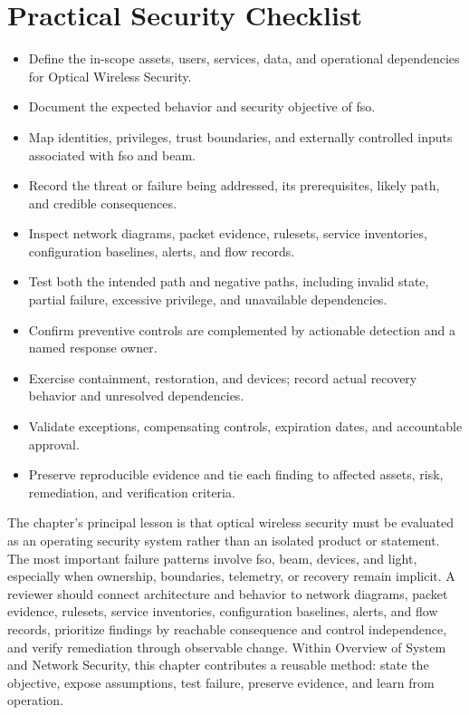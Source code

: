 \documentclass[11pt]{article}
\begin{document}
\section*{Practical Security Checklist}
\begin{itemize}[label=$\square$]
\item Define the in-scope assets, users, services, data, and operational dependencies for Optical Wireless Security.
\item Document the expected behavior and security objective of fso.
\item Map identities, privileges, trust boundaries, and externally controlled inputs associated with fso and beam.
\item Record the threat or failure being addressed, its prerequisites, likely path, and credible consequences.
\item Inspect network diagrams, packet evidence, rulesets, service inventories, configuration baselines, alerts, and flow records.
\item Test both the intended path and negative paths, including invalid state, partial failure, excessive privilege, and unavailable dependencies.
\item Confirm preventive controls are complemented by actionable detection and a named response owner.
\item Exercise containment, restoration, and devices; record actual recovery behavior and unresolved dependencies.
\item Validate exceptions, compensating controls, expiration dates, and accountable approval.
\item Preserve reproducible evidence and tie each finding to affected assets, risk, remediation, and verification criteria.
\end{itemize}
\begin{synthesisbox}
The chapter's principal lesson is that optical wireless security must be evaluated as an operating security system rather than an isolated product or statement. The most important failure patterns involve fso, beam, devices, and light, especially when ownership, boundaries, telemetry, or recovery remain implicit. A reviewer should connect architecture and behavior to network diagrams, packet evidence, rulesets, service inventories, configuration baselines, alerts, and flow records, prioritize findings by reachable consequence and control independence, and verify remediation through observable change. Within Overview of System and Network Security, this chapter contributes a reusable method: state the objective, expose assumptions, test failure, preserve evidence, and learn from operation.
\end{synthesisbox}
\end{document}
